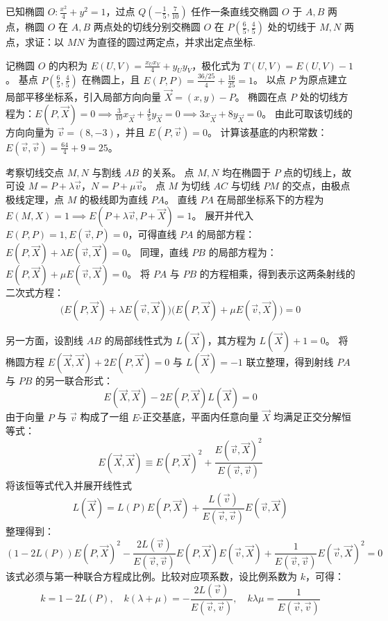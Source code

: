 \begin{exercise}
已知椭圆 \(O: \frac{x^2}{4} + y^2 = 1\)，过点 \(Q\left(-\frac{1}{5}, \frac{7}{10}\right)\) 任作一条直线交椭圆 \(O\) 于 \(A, B\) 两点，椭圆 \(O\) 在 \(A, B\) 两点处的切线分别交椭圆 \(O\) 在 \(P\left(\frac{6}{5}, \frac{4}{5}\right)\) 处的切线于 \(M, N\) 两点，求证：以 \(MN\) 为直径的圆过两定点，并求出定点坐标.
\end{exercise}
\begin{solution}
记椭圆 $O$ 的内积为 $E(U,V) = \frac{x_U x_V}{4} + y_U y_V$，极化式为 $T(U,V) = E(U,V) - 1$。
基点 $P\left(\frac{6}{5}, \frac{4}{5}\right)$ 在椭圆上，且 $E(P,P) = \frac{36/25}{4} + \frac{16}{25} = 1$。
以点 $P$ 为原点建立局部平移坐标系，引入局部方向向量 $\vec{X} = (x, y) - P$。
椭圆在点 $P$ 处的切线方程为：$E(P, \vec{X}) = 0 \implies \frac{3}{10}x_{\vec{X}} + \frac{4}{5}y_{\vec{X}} = 0 \implies 3x_{\vec{X}} + 8y_{\vec{X}} = 0$。
由此可取该切线的方向向量为 $\vec{v} = (8, -3)$，并且 $E(P, \vec{v}) = 0$。
计算该基底的内积常数：$E(\vec{v}, \vec{v}) = \frac{64}{4} + 9 = 25$。

考察切线交点 $M, N$ 与割线 $AB$ 的关系。
点 $M, N$ 均在椭圆于 $P$ 点的切线上，故可设 $M = P + \lambda \vec{v}$，$N = P + \mu \vec{v}$。
点 $M$ 为切线 $AC$ 与切线 $PM$ 的交点，由极点极线定理，点 $M$ 的极线即为直线 $PA$。
直线 $PA$ 在局部坐标系下的方程为 $E(M, X) = 1 \implies E(P+\lambda\vec{v}, P+\vec{X}) = 1$。
展开并代入 $E(P,P)=1, E(\vec{v},P)=0$，可得直线 $PA$ 的局部方程：$E(P, \vec{X}) + \lambda E(\vec{v}, \vec{X}) = 0$。
同理，直线 $PB$ 的局部方程为：$E(P, \vec{X}) + \mu E(\vec{v}, \vec{X}) = 0$。
将 $PA$ 与 $PB$ 的方程相乘，得到表示这两条射线的二次式方程：
$$ \big(E(P, \vec{X}) + \lambda E(\vec{v}, \vec{X})\big)\big(E(P, \vec{X}) + \mu E(\vec{v}, \vec{X})\big) = 0 $$

另一方面，设割线 $AB$ 的局部线性式为 $L(\vec{X})$，其方程为 $L(\vec{X}) + 1 = 0$。
将椭圆方程 $E(\vec{X}, \vec{X}) + 2E(P, \vec{X}) = 0$ 与 $L(\vec{X}) = -1$ 联立整理，得到射线 $PA$ 与 $PB$ 的另一联合形式：
$$ E(\vec{X}, \vec{X}) - 2E(P, \vec{X})L(\vec{X}) = 0 $$
由于向量 $P$ 与 $\vec{v}$ 构成了一组 $E$-正交基底，平面内任意向量 $\vec{X}$ 均满足正交分解恒等式：
$$ E(\vec{X}, \vec{X}) \equiv E(P, \vec{X})^2 + \frac{E(\vec{v}, \vec{X})^2}{E(\vec{v}, \vec{v})} $$
将该恒等式代入并展开线性式
$$L(\vec{X}) = L(P) E(P, \vec{X}) + \frac{L(\vec{v})}{E(\vec{v}, \vec{v})} E(\vec{v}, \vec{X})$$
整理得到：
$$ (1 - 2L(P)) E(P, \vec{X})^2 - \frac{2L(\vec{v})}{E(\vec{v}, \vec{v})} E(P, \vec{X})E(\vec{v}, \vec{X}) + \frac{1}{E(\vec{v}, \vec{v})} E(\vec{v}, \vec{X})^2 = 0 $$
该式必须与第一种联合方程成比例。比较对应项系数，设比例系数为 $k$，可得：
$$ k = 1 - 2L(P), \quad k(\lambda+\mu) = -\frac{2L(\vec{v})}{E(\vec{v}, \vec{v})}, \quad k\lambda\mu = \frac{1}{E(\vec{v}, \vec{v})} $$


\end{solution}
